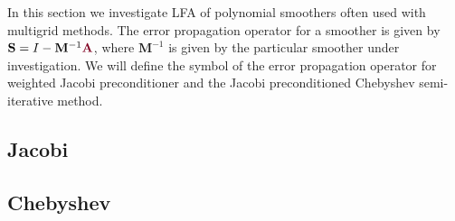 In this section we investigate LFA of polynomial smoothers often used with multigrid methods.
The error propagation operator for a smoother is given by $\mathbf{S} = I - \mathbf{M}^{-1} {\color{burgundy}\mathbf{A}}$, where $\mathbf{M}^{-1}$ is given by the particular smoother under investigation.
We will define the symbol of the error propagation operator for weighted Jacobi preconditioner and the Jacobi preconditioned Chebyshev semi-iterative method.

\subsection{Jacobi}


\subsection{Chebyshev}


